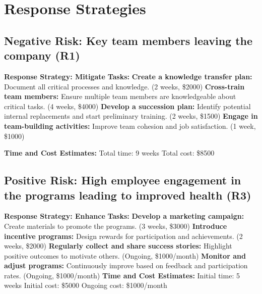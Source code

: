 \section*{Response Strategies}

\subsection*{Negative Risk: Key team members leaving the company (R1)} 
\begin{outline}
    \1 \textbf{Response Strategy: Mitigate}
        \2 \textbf{Tasks:}
            \3 \textbf{Create a knowledge transfer plan:} Document all critical processes and knowledge. (2 weeks, \$2000)
            \3 \textbf{Cross-train team members:} Ensure multiple team members are knowledgeable about critical tasks. (4 weeks, \$4000)
            \3 \textbf{Develop a succession plan:} Identify potential internal replacements and start preliminary training. (2 weeks, \$1500)
            \3 \textbf{Engage in team-building activities:} Improve team cohesion and job satisfaction. (1 week, \$1000)
\end{outline}
\begin{outline}
    \1 \textbf{Time and Cost Estimates:} 
        \2 Total time: 9 weeks 
        \2 Total cost: \$8500
\end{outline}
\pagebreak
\subsection*{Positive Risk: High employee engagement in the programs leading to improved health (R3)}
\begin{outline}
    \1 \textbf{Response Strategy: Enhance} 
        \2 \textbf{Tasks:}
            \3 \textbf{Develop a marketing campaign:} Create materials to promote the programs. (3 weeks, \$3000)
            \3 \textbf{Introduce incentive programs:} Design rewards for participation and achievements. (2 weeks, \$2000)
            \3 \textbf{Regularly collect and share success stories:} Highlight positive outcomes to motivate others. (Ongoing, \$1000/month)
            \3 \textbf{Monitor and adjust programs:} Continuously improve based on feedback and participation rates. (Ongoing, \$1000/month)
    \1 \textbf{Time and Cost Estimates:} 
        \2 Initial time: 5 weeks 
        \2 Initial cost: \$5000 
        \2 Ongoing cost: \$1000/month

\end{outline}

\FloatBarrier
\newpage